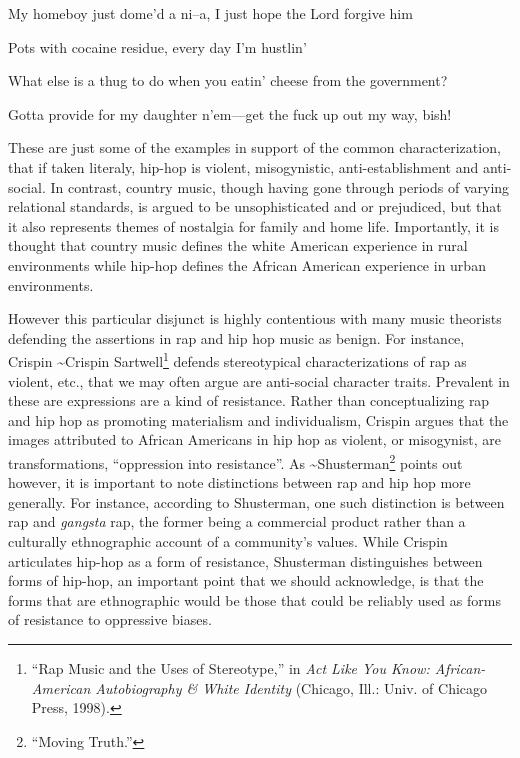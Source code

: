 \documentclass[
  12pt,
]{book}
\theoremstyle{definition}
\theoremstyle{definition}
\theoremstyle{definition}
\theoremstyle{definition}
\theoremstyle{remark}
\begin{document}
My homeboy just dome'd a ni--a, I just hope the Lord forgive him

Pots with cocaine residue, every day I'm hustlin'

What else is a thug to do when you eatin' cheese from the government?

Gotta provide for my daughter n'em---get the fuck up out my way, bish!

These are just some of the examples in support of the common characterization, that if taken literaly, hip-hop is violent, misogynistic, anti-establishment and anti-social. In contrast, country music, though having gone through periods of varying relational standards, is argued to be unsophisticated and or prejudiced, but that it also represents themes of nostalgia for family and home life. Importantly, it is thought that country music defines the white American experience in rural environments while hip-hop defines the African American experience in urban environments.

However this particular disjunct is highly contentious with many music theorists defending the assertions in rap and hip hop music as benign. For instance, Crispin \textasciitilde{}Crispin Sartwell\footnote{{``Rap {Music} and the {Uses} of {Stereotype},''} in \emph{Act Like You Know: {African-American} Autobiography \& White Identity} (Chicago, Ill.: Univ. of Chicago Press, 1998).} defends stereotypical characterizations of rap as violent, etc., that we may often argue are anti-social character traits. Prevalent in these are expressions are a kind of resistance. Rather than conceptualizing rap and hip hop as promoting materialism and individualism, Crispin argues that the images attributed to African Americans in hip hop as violent, or misogynist, are transformations, ``oppression into resistance''. As \textasciitilde{}Shusterman\footnote{{``Moving {Truth}.''}} points out however, it is important to note distinctions between rap and hip hop more generally. For instance, according to Shusterman, one such distinction is between rap and \emph{gangsta} rap, the former being a commercial product rather than a culturally ethnographic account of a community's values. While Crispin articulates hip-hop as a form of resistance, Shusterman distinguishes between forms of hip-hop, an important point that we should acknowledge, is that the forms that are ethnographic would be those that could be reliably used as forms of resistance to oppressive biases.
\end{document}
